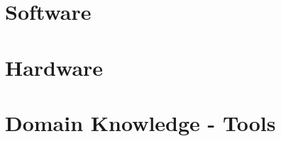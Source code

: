 \documentclass[10pt,a4paper,bibliography=totoc]{scrbook}
\begin{document}
    
   

\tableofcontents
\newpage

\listoffigures
\newpage

\cleardoublepage

%

\newpage


  
 

  
\part{Software}  

%    
%
%    
%
%    

    


     

 


  

\part{Hardware}  






%







\part{Domain Knowledge - Tools}  
\end{document}

